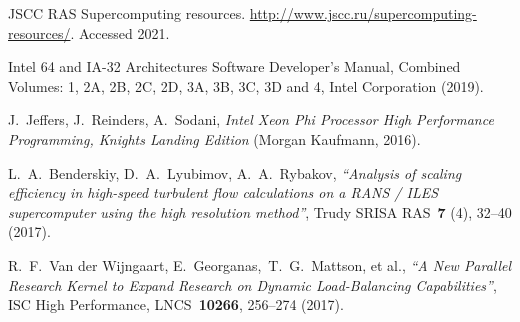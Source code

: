 \documentclass[
11pt,%
tightenlines,%
twoside,%
onecolumn,%
nofloats,%
nobibnotes,%
nofootinbib,%
superscriptaddress,%
noshowpacs,%
centertags]%
{revtex4}
\begin{document}
\begin{thebibliography}{99}
JSCC RAS Supercomputing resources. \url{http://www.jscc.ru/supercomputing-resources/}. Accessed 2021.

Intel 64 and IA-32 Architectures Software Developer's Manual, Combined Volumes: 1, 2A, 2B, 2C, 2D, 3A, 3B, 3C, 3D and 4, Intel Corporation (2019).

J.~Jeffers, J.~Reinders, A.~Sodani, \emph{Intel Xeon Phi Processor High Performance Programming, Knights Landing Edition} (Morgan Kaufmann, 2016).

L.~A.~Benderskiy, D.~A.~Lyubimov, A.~A.~Rybakov, {\it ``Analysis of scaling efficiency in high-speed turbulent flow calculations on a RANS / ILES supercomputer using the high resolution method''}, Trudy SRISA RAS~{\bf 7} (4), 32--40 (2017).

R.~F.~Van der Wijngaart, E.~Georganas,~T.~G.~Mattson, et al., {\it ``A New Parallel Research Kernel to Expand Research on Dynamic Load-Balancing Capabilities''}, ISC High Performance, LNCS~{\bf 10266}, 256--274 (2017).


\end{thebibliography}
\end{document}
